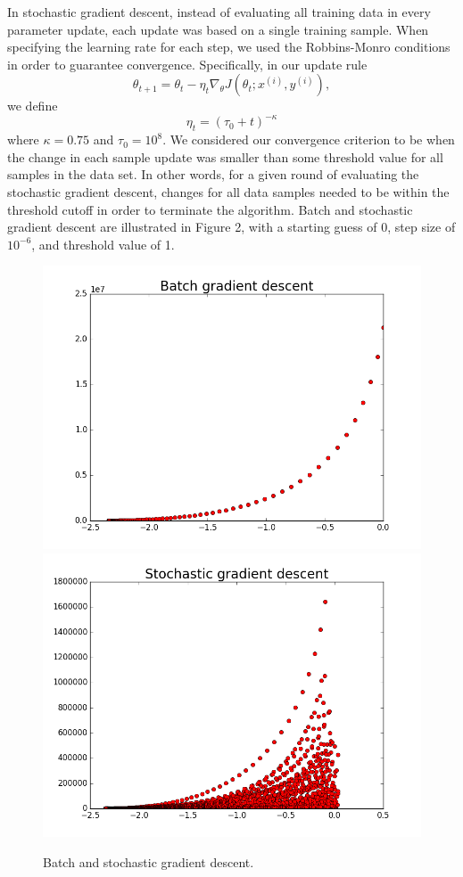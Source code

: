 \documentclass{article}
\begin{document}
In stochastic gradient descent, instead of evaluating all training data in every parameter update, each update was based on a single training sample. When specifying the learning rate for each step, we used the Robbins-Monro conditions in order to guarantee convergence. Specifically, in our update rule
$$\theta_{t+1} = \theta_{t} - \eta_{t}\nabla_{\theta}J(\theta_t; x^{(i)}, y^{(i)}),$$
we define
$$\eta_t = (\tau_0 + t)^{-\kappa}$$
where $\kappa = 0.75$ and $\tau_{0} = 10^{8}$. We considered our convergence criterion to be when the change in each sample update was smaller than some threshold value for all samples in the data set. In other words, for a given round of evaluating the stochastic gradient descent, changes for all data samples needed to be within the threshold cutoff in order to terminate the algorithm. Batch and stochastic gradient descent are illustrated in Figure 2, with a starting guess of 0, step size of $10^{-6}$, and threshold value of 1.

\begin{figure}[width=\linewidth]
\centering
\begin{multicols}{2}
  \includegraphics[width=1.2\linewidth]{code/P1/batch_gradient_descent.png}
  \includegraphics[width=1.2\linewidth]{code/P1/sgd.png}
\end{multicols}
\caption{Batch and stochastic gradient descent.}
\end{figure}
\end{document}
